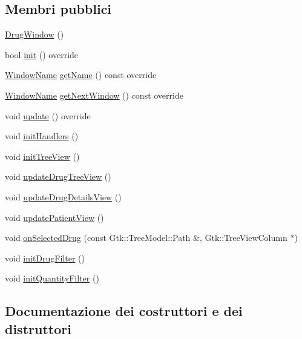 \subsection*{Membri pubblici}
\begin{DoxyCompactItemize}
\item 
\mbox{\hyperlink{classmm_1_1_drug_window_a7324435f0124010f172507467454d1a5}{Drug\+Window}} ()
\item 
bool \mbox{\hyperlink{classmm_1_1_drug_window_a54f331f1c516ce9113a9dade43948a16}{init}} () override
\item 
\mbox{\hyperlink{namespacemm_a4e9d92e04f65dbf2fc1963947da0d93c}{Window\+Name}} \mbox{\hyperlink{classmm_1_1_drug_window_aa33aafc6205abc8c627d0b0a5849895b}{get\+Name}} () const override
\item 
\mbox{\hyperlink{namespacemm_a4e9d92e04f65dbf2fc1963947da0d93c}{Window\+Name}} \mbox{\hyperlink{classmm_1_1_drug_window_a571966bdd4a2ecf069cdca69c73726b2}{get\+Next\+Window}} () const override
\item 
void \mbox{\hyperlink{classmm_1_1_drug_window_a98c6d97f491cb648dede0ef3db2b13b2}{update}} () override
\item 
void \mbox{\hyperlink{classmm_1_1_drug_window_a4926180df1b7f3dfc1f2b1746522c6fb}{init\+Handlers}} ()
\item 
void \mbox{\hyperlink{classmm_1_1_drug_window_ac762c909bb394adccd41e1c6e97d8404}{init\+Tree\+View}} ()
\item 
void \mbox{\hyperlink{classmm_1_1_drug_window_a7a43f5981915470da37088a248006c0e}{update\+Drug\+Tree\+View}} ()
\item 
void \mbox{\hyperlink{classmm_1_1_drug_window_a5df5a3991bc26fcf5e4df2c622053c42}{update\+Drug\+Details\+View}} ()
\item 
void \mbox{\hyperlink{classmm_1_1_drug_window_a069d6731dcbf47f32e6be18a8ecb0472}{update\+Patient\+View}} ()
\item 
void \mbox{\hyperlink{classmm_1_1_drug_window_ad88417beac6e778776f939c31e6def7a}{on\+Selected\+Drug}} (const Gtk\+::\+Tree\+Model\+::\+Path \&, Gtk\+::\+Tree\+View\+Column $\ast$)
\item 
void \mbox{\hyperlink{classmm_1_1_drug_window_a2d01e24deaba42b7c24cf5b5457f4298}{init\+Drug\+Filter}} ()
\item 
void \mbox{\hyperlink{classmm_1_1_drug_window_a40c9dca8380e72b7468170db21bcfbe9}{init\+Quantity\+Filter}} ()
\end{DoxyCompactItemize}


\subsection{Documentazione dei costruttori e dei distruttori}
\mbox{\label{classmm_1_1_drug_window_a7324435f0124010f172507467454d1a5}} 
